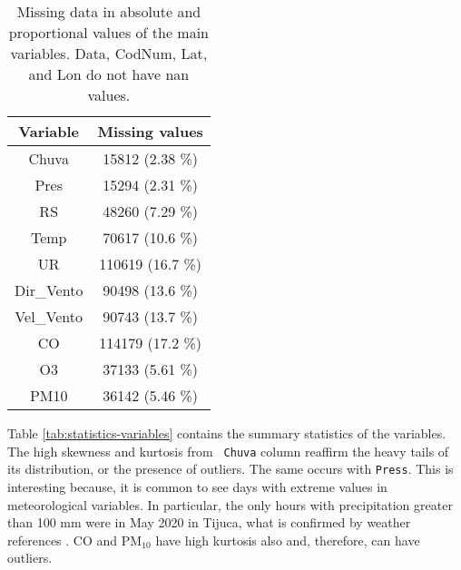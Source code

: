 \begin{table}
    \centering
    \begin{tabular}{|c|c|}
        \hline
        {\bf Variable} & {\bf Missing values} \\\hline
        Chuva     &   15812 (2.38 \%) \\\hline
        Pres      &   15294 (2.31 \%) \\\hline
        RS        &   48260 (7.29 \%) \\\hline
        Temp      &   70617 (10.6 \%) \\\hline
        UR        &  110619 (16.7 \%) \\\hline
        Dir\_Vento &   90498 (13.6 \%) \\\hline
        Vel\_Vento &   90743 (13.7 \%) \\\hline
        CO        &  114179 (17.2 \%) \\\hline
        O3        &   37133 (5.61 \%) \\\hline
        PM10      &   36142 (5.46 \%) \\\hline
    \end{tabular}
    \caption{Missing data in absolute and proportional values of the main variables. Data, CodNum, Lat, and Lon do not have nan values.}
    \label{tab:missing-values}    
\end{table}

Table \ref{tab:statistics-variables} contains the summary statistics of the variables. The high skewness and kurtosis from {\tt
Chuva} column reaffirm the heavy tails of its distribution, or the presence of
outliers. The same occurs with {\tt Press}. This is interesting because, it is common to see days with
extreme values in meteorological variables. In particular, the only hours with
precipitation greater than 100 mm were in May 2020 in Tijuca, what is
confirmed by weather references \cite{climatempo}. CO and PM$_{10}$ have high
kurtosis also and, therefore, can have outliers. 

